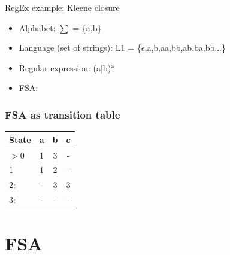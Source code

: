 \documentclass{beamer}
\def\dx{1cm} \def\dy{1.5cm}
\newcommand{\newState}[4]{\node[state,#3](#1)[#4]{#2};}
\newcommand{\newTransition}[4]{\path[->] (#1) edge [#4] node {#3} (#2);}
\begin{document}
\begin{frame}[t]{RegEx example: Kleene closure}
  \begin{itemize}
  \item Alphabet: $\sum$ = \{a,b\}
  \item Language (set of strings): L1 = \{$\epsilon$,a,b,aa,bb,ab,ba,bb...\}
  \item Regular expression: (a$\vert$b)*
  \item FSA:
  \end{itemize}

  \pause 

  \begin{center}
    \end{center}
\end{frame}

\begin{frame}[t]
\frametitle{FSA as transition table}
\begin{center}
  \begin{tabular}{|l|c|c|c|}
    \hline
    State & a & b & c \\
    \hline
    $>$0 & 1 & 3 & - \\
    \hline 
    1 & 1 & 2 & - \\
    \hline
    2: & - & 3 & 3 \\
    \hline
    3: & - & - & - \\
    \hline
  \end{tabular}
\end{center}
\end{frame}


\section{FSA}
\end{document}
